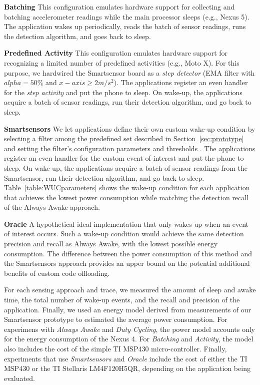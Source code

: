 \textbf{Batching} This configuration emulates hardware support for
collecting and batching accelerometer readings while the main
processor sleeps (e.g., Nexus 5).  The application wakes up
periodically, reads the batch of sensor readings, runs the detection
algorithm, and goes back to sleep.

\textbf{Predefined Activity} This configuration emulates hardware
support for recognizing a limited number of predefined activities
(e.g., Moto X).  For this purpose, we hardwired the Smartsensor board
as a {\em step detector} (EMA filter with $alpha = 50\%$ and $x-axis
\ge 2 m/s^2$).  The applications register an even handler for the {\em
  step activity} and put the phone to sleep.  On wake-up, the
applications acquire a batch of sensor readings, run their detection
algorithm, and go back to sleep.

\textbf{Smartsensors} We let applications define their own custom wake-up condition by selecting a filter among the predefined set described
in Section~\ref{sec:prototype} and setting the filter's configuration
parameters and thresholds .  The applications register an even handler
for the custom event of interest and put the phone to sleep.  On
wake-up, the applications acquire a batch of sensor readings from the
Smartsensor, run their detection algorithm, and go back to sleep.
Table~\ref{table:WUCparameters} shows the wake-up condition for each
application that achieves the lowest power consumption while matching
the detection recall of the Always Awake approach.

\textbf{Oracle} A hypothetical ideal implementation that only wakes up
when an event of interest occurs.  Such a wake-up condition would
achieve the same detection precision and recall as Always Awake, with
the lowest possible energy consumption. The difference between the
power consumption of this method and the Smartsensors approach
provides an upper bound on the potential additional benefits of custom
code offloading.

For each sensing approach and trace, we measured the amount of sleep
and awake time, the total number of wake-up events, and the recall and
precision of the application.  Finally, we used an energy model
derived from measurements of our Smartsensor prototype to estimated
the average power consumption.  For experimens with {\em Always Awake}
and {\em Duty Cycling}, the power model accounts only for the energy
consumption of the Nexus 4.  For {\em Batching} and {\em Activity},
the model also includes the cost of the simple TI MSP430
micro-controller.  Finally, experiments that use {\em Smartsensors} and {\em
  Oracle} include the cost of either the TI MSP430 or the TI Stellaris
LM4F120H5QR, depending on the application being evaluated.








